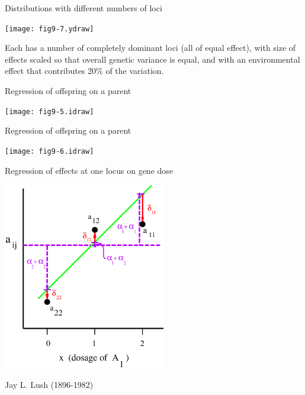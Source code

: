 \documentclass[pdf,bluish,slideColor,colorBG]{prosper}
\begin{document}
{\begin{slide}[Replace]{Distributions with different numbers of loci}
\centerline{\texttt{[image: fig9-7.ydraw]}}
\bigskip

Each has a number of completely dominant loci (all of equal effect), with
size of effects scaled so that overall genetic variance is equal, and
with an environmental effect that contributes 20\% of the variation.

\end{slide}

\begin{slide}[Replace]{Regression of offspring on a parent}

\centerline{\texttt{[image: fig9-5.idraw]}}

\end{slide}

\begin{slide}[Replace]{Regression of offspring on a parent}

\centerline{\texttt{[image: fig9-6.idraw]}}

\end{slide}

\begin{slide}[Replace]{Regression of effects at one locus on gene dose}

\centerline{\includegraphics[width=2.8in]{fig9-3.ps}}

\end{slide}

%
%
%
\begin{slide}[Replace]{Jay L. Lush (1896-1982) }
\bigskip


\end{slide}}
\end{document}
